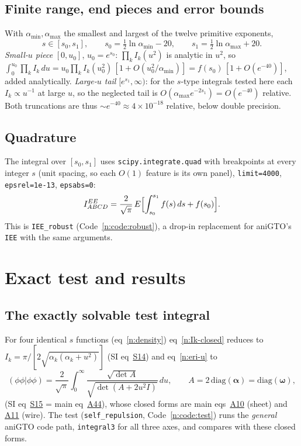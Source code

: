 \documentclass[11pt]{article}
\begin{document}
\subsection{Finite range, end pieces and error bounds}
With $\alpha_{\min},\alpha_{\max}$ the smallest and largest of the twelve primitive exponents,
\begin{equation}
s\in[s_0,s_1],\qquad s_0=\tfrac12\ln\alpha_{\min}-20,\qquad s_1=\tfrac12\ln\alpha_{\max}+20 .
\label{n:range}
\end{equation}
\emph{Small-$u$ piece} $[0,u_0]$, $u_0=e^{s_0}$: $\prod_kI_k(u^2)$ is analytic in $u^2$, so
$\int_0^{u_0}\prod_kI_k\,du=u_0\prod_kI_k(u_0^2)\,[1+O(u_0^2/\alpha_{\min})]=f(s_0)\,[1+O(e^{-40})]$, added
analytically.  \emph{Large-$u$ tail} $[e^{s_1},\infty)$: for the $s$-type integrals tested here each
$I_k\propto u^{-1}$ at large $u$, so the neglected tail is $O(\alpha_{\max}e^{-2s_1})=O(e^{-40})$ relative.  Both
truncations are thus $\sim e^{-40}\approx4\times10^{-18}$ relative, below double precision.

\subsection{Quadrature}
The integral over $[s_0,s_1]$ uses \texttt{scipy.integrate.quad} with breakpoints at every integer $s$ (unit
spacing, so each $O(1)$ feature is its own panel), \texttt{limit=4000}, \texttt{epsrel=1e-13},
\texttt{epsabs=0}:
\begin{equation}
I^{EE}_{ABCD}=\frac{2}{\sqrt\pi}\,E\Bigl[\int_{s_0}^{s_1}f(s)\,ds+f(s_0)\Bigr].
\label{n:final}
\end{equation}
This is \texttt{IEE\_robust} (Code~\ref{n:code:robust}), a drop-in replacement for aniGTO's \texttt{IEE} with
the same arguments.

\section{Exact test and results}
\label{n:sec:results}
\subsection{The exactly solvable test integral}
For four identical $s$ functions (eq~\ref{n:density}) eq~\ref{n:Ik-closed} reduces to
$I_k=\pi/[2\sqrt{\alpha_k(\alpha_k+u^2)}]$ (SI eq~\href{si.pdf\#equation.14}{S14}) and eq~\ref{n:eri-u} to
\begin{equation}
(\phi\phi|\phi\phi)=\frac{2}{\sqrt\pi}\int_0^\infty\frac{\sqrt{\det A}}{\sqrt{\det(A+2u^2I)}}\,du,
\qquad A=2\,\mathrm{diag}(\boldsymbol\alpha)=\mathrm{diag}(\boldsymbol\omega),
\label{n:self}
\end{equation}
(SI eq~\href{si.pdf\#equation.15}{S15} = main eq~\href{main.pdf\#equation.44}{A44}), whose closed forms are main eqs~\href{main.pdf\#equation.10}{A10}
(sheet) and \href{main.pdf\#equation.11}{A11} (wire).  The test (\texttt{self\_repulsion}, Code~\ref{n:code:test}) runs the
\emph{general} aniGTO code path, \texttt{integral3} for all three axes, and compares with these closed forms.
\end{document}
